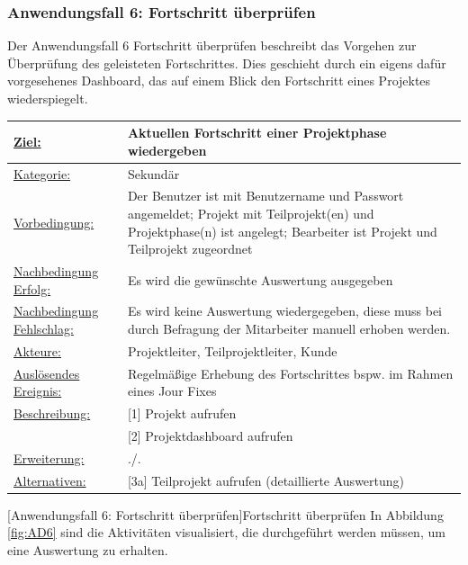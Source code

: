 \subsubsection{Anwendungsfall 6: Fortschritt überprüfen}
Der Anwendungsfall 6 \glqq{}Fortschritt überprüfen\grqq{} beschreibt das Vorgehen zur Überprüfung des geleisteten Fortschrittes. Dies geschieht durch ein eigens dafür vorgesehenes Dashboard, das auf einem Blick den Fortschritt eines Projektes wiederspiegelt.\\
\begin{tabularx}{\textwidth}{|p{}|p{}|}
        \hline
        \underline{Ziel:} & Aktuellen Fortschritt einer Projektphase wiedergeben\\\hline
        \underline{Kategorie:} & Sekundär \\\hline
        \underline{Vorbedingung:} & Der Benutzer ist mit Benutzername und Passwort angemeldet; Projekt mit Teilprojekt(en) und Projektphase(n) ist angelegt; Bearbeiter ist Projekt und Teilprojekt zugeordnet\\\hline
        \underline{Nachbedingung Erfolg:} & Es wird die gewünschte Auswertung ausgegeben\\\hline
        \underline{Nachbedingung Fehlschlag:} &  Es wird keine Auswertung wiedergegeben, diese muss bei durch Befragung der Mitarbeiter manuell erhoben werden.\\\hline
        \underline{Akteure:} & Projektleiter, Teilprojektleiter, Kunde \\\hline
        \underline{Auslösendes Ereignis:} & Regelmäßige Erhebung des Fortschrittes bspw. im Rahmen eines Jour Fixes \\\hline        
        \multirow{1}{*}{\underline{Beschreibung:}} & [1] Projekt aufrufen\\
        & [2] Projektdashboard aufrufen\\\hline
        \multirow{1}{*}{\underline{Erweiterung:}} & ./. \\\hline
        \underline{Alternativen:} & [3a] Teilprojekt aufrufen (detaillierte Auswertung)\\\hline
\end{tabularx}
[Anwendungsfall 6: Fortschritt überprüfen]{Fortschritt überprüfen}
\newpage
In Abbildung \ref{fig:AD6} sind die Aktivitäten visualisiert, die durchgeführt werden müssen, um eine Auswertung zu erhalten.
